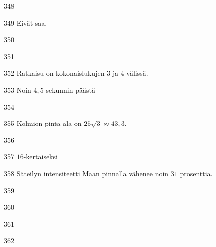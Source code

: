 \begin{Vastaus}{348}
\end{Vastaus}
\begin{Vastaus}{349}
Eivät saa.
\end{Vastaus}
\begin{Vastaus}{350}
	
\end{Vastaus}
\begin{Vastaus}{351}
	
\end{Vastaus}
\begin{Vastaus}{352}
Ratkaisu on kokonaislukujen $3$ ja $4$ välissä.
	
\end{Vastaus}
\begin{Vastaus}{353}
Noin $4,5$ sekunnin päästä
	
\end{Vastaus}
\begin{Vastaus}{354}
	
\end{Vastaus}
\begin{Vastaus}{355}
Kolmion pinta-ala on $25\sqrt{3}\approx43,3$.
\end{Vastaus}
\begin{Vastaus}{356}
\end{Vastaus}
\begin{Vastaus}{357}
$16$-kertaiseksi
\end{Vastaus}
\begin{Vastaus}{358}
Säteilyn intensiteetti Maan pinnalla vähenee noin $31$ prosenttia.
\end{Vastaus}
\begin{Vastaus}{359}
\end{Vastaus}
\begin{Vastaus}{360}
\end{Vastaus}
\begin{Vastaus}{361}
\end{Vastaus}
\begin{Vastaus}{362}
\end{Vastaus}
